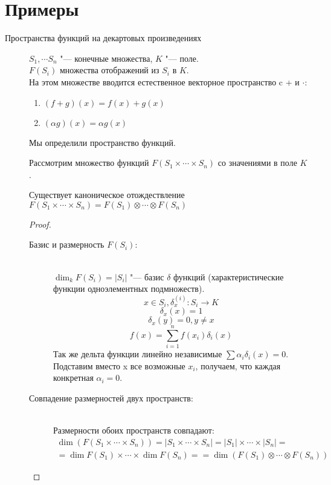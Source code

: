 ﻿\section{Примеры}
\begin{description}
\item [Пространства функций на декартовых произведениях] 
    \begin{Def}
    $S_1, \cdots S_n$ "--- конечные множества, $K$ "--- поле.\\ 
    $F(S_i)$ множества отображений из $S_i$ в $K$.\\
   
    На этом множестве вводится естественное векторное пространство c + и $\cdot$:
    \begin{enumerate}
    \item $(f + g)(x) = f(x) + g(x)$\\
    \item $(\alpha g)(x) = \alpha g(x)$\\ 
    \end{enumerate}

    Мы определили пространство функций.
    \end{Def}
     
    Рассмотрим множество функций $F(S_1 \times \cdots \times S_n)$ со значениями в поле $K$.
   
    \begin{lemma}
    Существует каноническое отождествление 
    $F(S_1 \times \cdots \times S_n) = F(S_1) \otimes \cdots \otimes F(S_n)$
    \end{lemma}
    \begin{proof}
    \begin{description}
    \item[Базис и размерность $F(S_i)$:] \hfill \\
    $\dim_k F(S_i) = |S_i|$ "--- базис $\delta$ функций (характеристические функции одноэлементных подмножеств).
    $$x \in S_i, \delta_{x}^{(i)} \colon S_i \to K$$
    $$\delta_{x}(x) = 1$$
    $$\delta_{x}(y) = 0, y \ne x$$    
    $$f(x) = \sum_{i = 1}^{n}f(x_i)\delta_i(x)$$
    Так же дельта функции линейно независимые $\sum \alpha_i \delta_i(x) = 0$.
    Подставим вместо x все возможные $x_i$, получаем, что каждая конкретная $\alpha_i = 0$.                                         

    \item[Совпадение размерностей двух пространств:] \hfill \\
     Размерности обоих пространств совпадают: 
    \begin{gather*}
    \dim(F(S_1 \times \cdots \times S_n)) = |S_1 \times \cdots \times S_n| = 
    |S_1| \times \cdots \times |S_n| = \\
    = \dim F(S_1) \times \cdots \times \dim F(S_n) = 
    = \dim (F(S_1) \otimes \cdots \otimes F(S_n))
    \end{gather*}


\end{description}
\end{proof}
\end{description}
